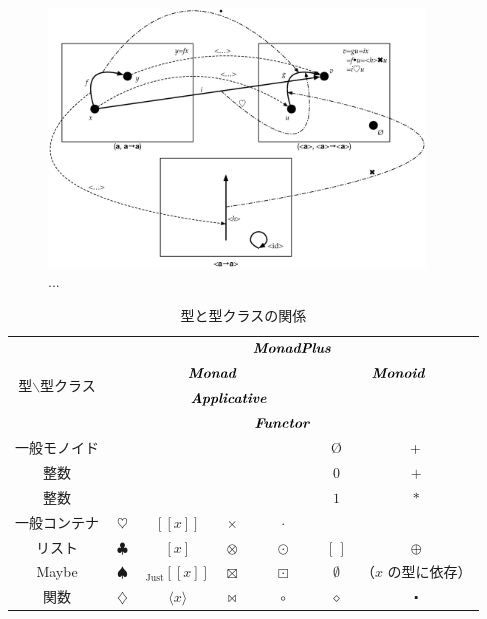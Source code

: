 \documentclass[a5paper,twoside,fleqn,draft]{jsbook}
\def\[{[\![}
\def\]{]\!]}
\newcommand{\code}[1]{\texttt{#1}}
\newcommand{\mEmptyList}{{[\,]}}
\newcommand{\mNothing}{\emptyset}
\newcommand{\mZero}{\text{\O}}
\newcommand{\mAnonParam}{\diamond}
\DeclareMathOperator{\mAppend}{\oplus}
\DeclareMathOperator{\mAppMap}{\times}
\DeclareMathOperator{\mAppMapFunc}{\bowtie}
\DeclareMathOperator{\mAppMapList}{\otimes}
\DeclareMathOperator{\mAppMapMaybe}{\boxtimes}
\DeclareMathOperator{\mBind}{\heartsuit}
\DeclareMathOperator{\mBindFunc}{\diamondsuit}
\DeclareMathOperator{\mBindList}{\clubsuit}
\DeclareMathOperator{\mBindMaybe}{\spadesuit}
\DeclareMathOperator{\mCompFunc}{\centerdot}
\DeclareMathOperator{\mMap}{\cdot}
\DeclareMathOperator{\mMapFunc}{\circ}
\DeclareMathOperator{\mMapList}{\odot}
\DeclareMathOperator{\mMapMaybe}{\boxdot}
\DeclareMathOperator{\mPlus}{\bf{+}} %
\newcommand{\mValueConstructor}[1]{\mathrm{#1}}
\newcommand{\mValueWith}[2]{{}_\mValueConstructor{#1}\[#2\]}
\newcommand{\mJustWith}[1]{\mValueWith{Just}{#1}}
\newcommand{\mConstWith}[1]{\langle#1\rangle}
\newcommand{\mPureWith}[1]{\[#1\]}
\newcommand{\mTypeClass}[1]{\textbf{\textit{#1}}}
\newcommand{\mApplicativeTypeClass}{\mTypeClass{Applicative}}
\newcommand{\mFunctorTypeClass}{\mTypeClass{Functor}}
\newcommand{\mMonadTypeClass}{\mTypeClass{Monad}}
\newcommand{\mMonadPlusTypeClass}{\mTypeClass{MonadPlus}}
\newcommand{\mMonoidTypeClass}{\mTypeClass{Monoid}}
\begin{document}
\begin{figure}
\begin{center}
\includegraphics[width=100mm]{fig/functor.eps}
\end{center}
\caption{...}
\label{fig:functor}
\end{figure}


\begin{table}
\label{tab:monadplus}
\caption{型と型クラスの関係}
\begin{center}
\begin{tabular}{||c||c|c|c|c|c|c||}
\hline
\multirow{4}{*}{型$\backslash$型クラス}
  &\multicolumn{6}{|c||}{$\mMonadPlusTypeClass$}\\
\cline{2-7}
\multirow{3}{*}{}
  &\multicolumn{4}{|c|}{$\mMonadTypeClass$}
  &\multicolumn{2}{|c||}{$\mMonoidTypeClass$}\\
\cline{3-5}
\multirow{2}{*}{}
  &
  &\multicolumn{3}{|c|}{$\mApplicativeTypeClass$}
  &\multicolumn{2}{|c||}{}\\
\cline{5-5}
\multirow{1}{*}{}
  &
  &\multicolumn{2}{|c|}{}
  &$\mFunctorTypeClass$
  &\multicolumn{2}{|c||}{}\\
\hline\hline
一般モノイド
  &
  &
  &
  &
  &$\mZero$
  &$\mPlus$\\
\hline
整数
  &
  &
  &
  &
  &$0$
  &$+$\\
\hline
整数
  &
  &
  &
  &
  &$1$
  &$*$\\
\hline\hline
一般コンテナ
  &$\mBind$
  &$\mPureWith{x}$
  &$\mAppMap$
  &$\mMap$
  &
  &\\
\hline
リスト
  &$\mBindList$
  &$[x]$
  &$\mAppMapList$
  &$\mMapList$
  &$\mEmptyList$
  &$\mAppend$\\
\hline
Maybe
  &$\mBindMaybe$
  &$\mJustWith{x}$
  &$\mAppMapMaybe$
  &$\mMapMaybe$
  &$\mNothing$
  &（$x$ の型に依存）\\
\hline
関数
  &$\mBindFunc$
  &$\mConstWith{x}$
  &$\mAppMapFunc$
  &$\mMapFunc$
  &$\mAnonParam$
  &$\mCompFunc$\\
\hline
\end{tabular}
\end{center}
\end{table}
\end{document}
